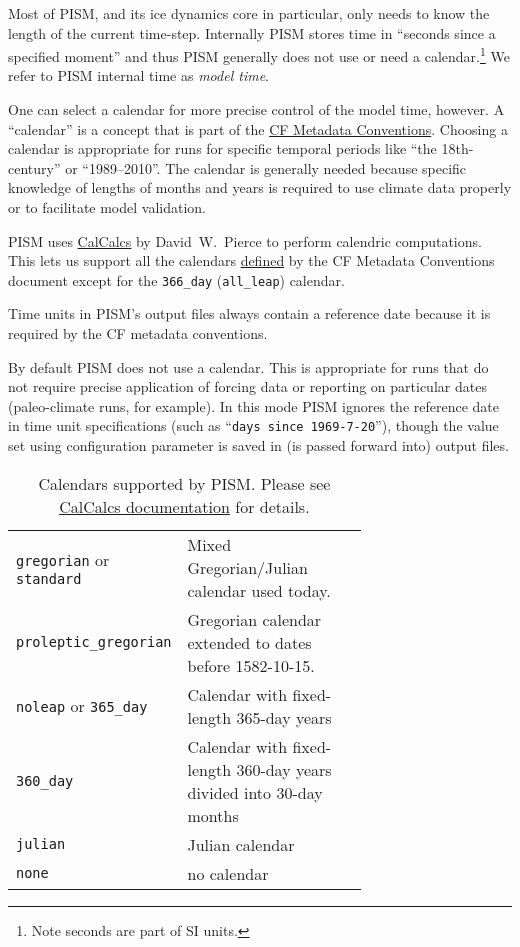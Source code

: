 Most of PISM, and its ice dynamics core in particular, only needs to know the length of the current time-step.  Internally PISM stores time in ``seconds since a specified moment'' and thus PISM generally does not use or need a calendar.\footnote{Note seconds are part of SI units.}  We refer to PISM internal time as \emph{model time}.

One can select a calendar for more precise control of the model time, however.  A ``calendar'' is a concept that is part of the \href{http://cf-pcmdi.llnl.gov/documents/cf-conventions/1.6/cf-conventions.html}{CF Metadata Conventions}.  Choosing a calendar is appropriate for runs for specific temporal periods like ``the 18th-century'' or ``1989--2010''.  The calendar is generally needed because  specific knowledge of lengths of months and years is required to use climate data properly or to facilitate model validation.

PISM uses \href{http://meteora.ucsd.edu/~pierce/calcalcs/index.html}{CalCalcs} by David~W.~Pierce to perform calendric computations.  This lets us support all the calendars \href{http://cf-pcmdi.llnl.gov/documents/cf-conventions/1.6/cf-conventions.html#calendar}{defined} by the CF Metadata Conventions document except for the \texttt{366_day} (\texttt{all_leap}) calendar.

Time units in PISM's output files always contain a reference date because it is required by the CF metadata conventions.

By default PISM does not use a calendar. This is appropriate for runs that do not require precise application of forcing data or reporting on particular dates (paleo-climate runs, for example).  In this mode PISM ignores the reference date in time unit specifications (such as ``\texttt{days since 1969-7-20}''), though the value set using  configuration parameter is saved in (is passed forward into) output files.

\begin{table}
  \centering
  \begin{tabular}{lp{0.7\linewidth}}
    \texttt{gregorian} or \texttt{standard} & Mixed Gregorian/Julian calendar used today.\\
    \texttt{proleptic_gregorian} & Gregorian calendar extended to dates before 1582-10-15.\\
    \texttt{noleap} or \texttt{365_day} & Calendar with fixed-length 365-day years\\
    \texttt{360_day} & Calendar with fixed-length 360-day years divided into 30-day months\\
    \texttt{julian} & Julian calendar \\
    \texttt{none} & no calendar\\
  \end{tabular}
  \caption{Calendars supported by PISM. Please see \href{http://meteora.ucsd.edu/~pierce/calcalcs/calendars.html}{CalCalcs documentation} for details.}
  \label{tab:calendars}
\end{table}

